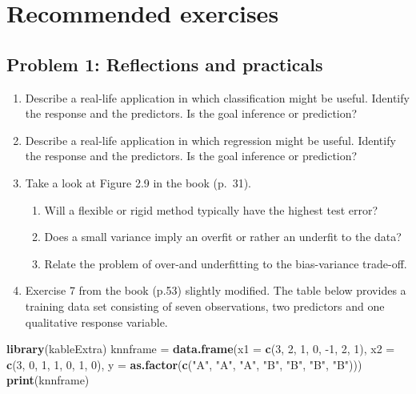 \documentclass[]{article}
\newenvironment{Shaded}{\begin{snugshade}}{\end{snugshade}}
\newcommand{\KeywordTok}[1]{\textcolor[rgb]{0.13,0.29,0.53}{\textbf{#1}}}
\newcommand{\DataTypeTok}[1]{\textcolor[rgb]{0.13,0.29,0.53}{#1}}
\newcommand{\DecValTok}[1]{\textcolor[rgb]{0.00,0.00,0.81}{#1}}
\newcommand{\StringTok}[1]{\textcolor[rgb]{0.31,0.60,0.02}{#1}}
\newcommand{\NormalTok}[1]{#1}
\providecommand{\tightlist}{%
  \setlength{\itemsep}{0pt}\setlength{\parskip}{0pt}}
\begin{document}
\section{Recommended exercises}\label{recommended-exercises}

\subsection{Problem 1: Reflections and
practicals}\label{problem-1-reflections-and-practicals}

\begin{enumerate}
\def\labelenumi{\arabic{enumi}.}
\item
  Describe a real-life application in which classification might be
  useful. Identify the response and the predictors. Is the goal
  inference or prediction?
\item
  Describe a real-life application in which regression might be useful.
  Identify the response and the predictors. Is the goal inference or
  prediction?
\item
  Take a look at Figure 2.9 in the book (p.~31).

  \begin{enumerate}
  \def\labelenumii{\alph{enumii}.}
  \tightlist
  \item
    Will a flexible or rigid method typically have the highest test
    error?
  \item
    Does a small variance imply an overfit or rather an underfit to the
    data?
  \item
    Relate the problem of over-and underfitting to the bias-variance
    trade-off.
  \end{enumerate}
\item
  Exercise 7 from the book (p.53) slightly modified. The table below
  provides a training data set consisting of seven observations, two
  predictors and one qualitative response variable.
\end{enumerate}

\begin{Shaded}
\begin{Highlighting}[]
\KeywordTok{library}\NormalTok{(kableExtra)}
\NormalTok{knnframe =}\StringTok{ }\KeywordTok{data.frame}\NormalTok{(}\DataTypeTok{x1 =} \KeywordTok{c}\NormalTok{(}\DecValTok{3}\NormalTok{, }\DecValTok{2}\NormalTok{, }\DecValTok{1}\NormalTok{, }\DecValTok{0}\NormalTok{, }\DecValTok{-1}\NormalTok{, }\DecValTok{2}\NormalTok{, }\DecValTok{1}\NormalTok{), }\DataTypeTok{x2 =} \KeywordTok{c}\NormalTok{(}\DecValTok{3}\NormalTok{, }\DecValTok{0}\NormalTok{, }\DecValTok{1}\NormalTok{, }\DecValTok{1}\NormalTok{, }
    \DecValTok{0}\NormalTok{, }\DecValTok{1}\NormalTok{, }\DecValTok{0}\NormalTok{), }\DataTypeTok{y =} \KeywordTok{as.factor}\NormalTok{(}\KeywordTok{c}\NormalTok{(}\StringTok{"A"}\NormalTok{, }\StringTok{"A"}\NormalTok{, }\StringTok{"A"}\NormalTok{, }\StringTok{"B"}\NormalTok{, }\StringTok{"B"}\NormalTok{, }\StringTok{"B"}\NormalTok{, }\StringTok{"B"}\NormalTok{)))}
\KeywordTok{print}\NormalTok{(knnframe)}
\end{Highlighting}
\end{Shaded}
\end{document}
